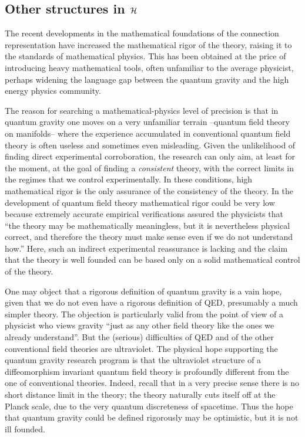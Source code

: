 \subsection{Other structures in $\cal H$} \label{otherstructures}

The recent developments in the mathematical foundations of the 
connection representation have increased the mathematical rigor 
of the theory, raising it to the standards of mathematical 
physics.  This has been obtained at the price of introducing 
heavy mathematical tools, often unfamiliar to the average 
physicist, perhaps widening the language gap between the quantum 
gravity and the high energy physics community. 

The reason for searching a mathematical-physics level of precision is 
that in quantum gravity one moves on a very unfamiliar terrain 
--quantum field theory on manifolds-- where the experience accumulated 
in conventional quantum field theory is often useless and sometimes 
even misleading.  Given the unlikelihood of finding direct 
experimental corroboration, the research can only aim, at least for 
the moment, at the goal of finding a {\em consistent\/} theory, with 
the correct limits in the regimes that we control experimentally.  In 
these conditions, high mathematical rigor is the only assurance of the 
consistency of the theory.  In the development of quantum field theory 
mathematical rigor could be very low because extremely accurate 
empirical verifications assured the physicists that ``the theory may 
be mathematically meaningless, but it is nevertheless physical 
correct, and therefore the theory must make sense even if we do not 
understand how.''  Here, such an indirect experimental reassurance is 
lacking and the claim that the theory is well founded can be based 
only on a solid mathematical control of the theory.

One may object that a rigorous definition of quantum gravity is a 
vain hope, given that we do not even have a rigorous definition of 
QED, presumably a much simpler theory.  The objection is 
particularly valid from the point of view of a  
physicist who views gravity ``just as any other field theory 
like the ones we already understand''.  But the (serious) 
difficulties of QED and of the other conventional field theories 
are ultraviolet.  The physical hope supporting the quantum 
gravity research program is that the ultraviolet structure of a 
diffeomorphism invariant quantum field theory is profoundly 
different from the one of conventional theories.  Indeed, recall 
that in a very precise sense there is no short distance limit in 
the theory; the theory naturally cuts itself off at the Planck 
scale, due to the very quantum discreteness of spacetime.  Thus 
the hope that quantum gravity could be defined rigorously may be 
optimistic, but it is not ill founded.

